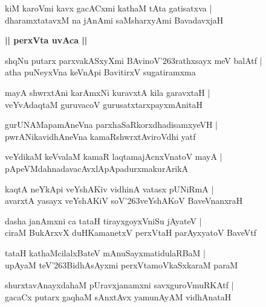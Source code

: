 \documentclass[twoside,12pt,openright]{book}
\def\S{\char'263}
\newcounter{shloka}[chapter]
\def\uvaca#1{\centerline{{\large\textbf{#1}}}}
\begin{document}
\begin{shloka}%
kiM karoVmi kavx gacACxmi kathaM tAta gatisatxva |\\
dharamxtatavxM na jAnAmi saMsharxyAmi BavadavxjaH 
\end{shloka}

\uvaca{|| perxVta uvAca ||}

\begin{shloka}%
shqNu putarx parxvakASxyXmi BAvinoV\S rathxsayx meV balAtf |\\
atha puNeyxVna keVnApi BavitirxV sugatiramxma 
\end{shloka}

\begin{shloka}%
mayA shwrxtAni karAmxNi kuravxtA kila garavxtaH |\\
veYvAdaqtaM guruvacoV gurusatxtarxpayxmAnitaH 
\end{shloka}

\begin{shloka}%
gurUNAMapamAneVna parxhaSaRkorxdhadisamxyeVH |\\
pwrANikavidhAneVna kamaRshwrxtAviroVdhi yatf
\end{shloka}

\begin{shloka}%
veYdikaM keVvalaM kamaR laqtamajAcnxVnatoV mayA |\\
pApeVMdahnadavacAvxlApApadurxmakurArikA
\end{shloka}

\begin{shloka}%
kaqtA neYkApi veYshAKiv vidhinA vatasx pUNiRmA |\\
avarxtA yasayx veYshAKiV soV\S veYshAKoV BaveVnanxraH 
\end{shloka}

\begin{shloka}%
dasha janAmxni ca tataH tirayxgoyxVniSu jAyateV |\\
ciraM BukArxvX duHKamanetxV perxVtaH parAyxyatoV BaveVtf
\end{shloka}

\begin{shloka}%
tataH kathaMcilalxBateV mAnuSayxmatidulaRBaM |\\
upAyaM teV\S BidhAsAyxmi perxVtamoVkaSxkaraM paraM 
\end{shloka}

\begin{shloka}%
shurxtavAnayxdahaM pUravxjanamxni savxguroVmuRKAtf |\\
gacaCx putarx gaqhaM sAnxtAvx yamunAyAM vidhAnataH 
\end{shloka}
\end{document}
